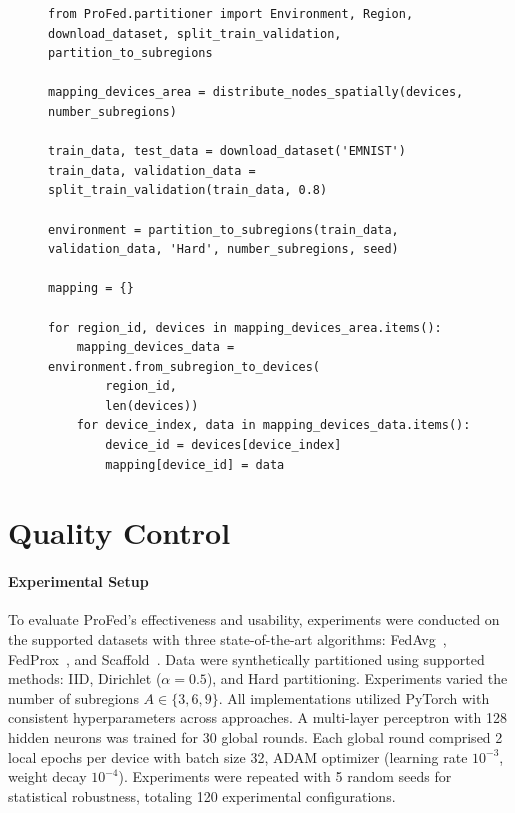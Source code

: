\begin{figure}
\begin{lstlisting}[style=proFedStyle, caption={An example of how ProFed is used to partition the EMNIST dataset among devices}, label={lst:api-example}]
from ProFed.partitioner import Environment, Region, download_dataset, split_train_validation, partition_to_subregions

mapping_devices_area = distribute_nodes_spatially(devices, number_subregions)

train_data, test_data = download_dataset('EMNIST')
train_data, validation_data = split_train_validation(train_data, 0.8)

environment = partition_to_subregions(train_data, validation_data, 'Hard', number_subregions, seed)

mapping = {}

for region_id, devices in mapping_devices_area.items():
    mapping_devices_data = environment.from_subregion_to_devices(
		region_id, 
		len(devices))
    for device_index, data in mapping_devices_data.items():
        device_id = devices[device_index]
        mapping[device_id] = data
\end{lstlisting}
\end{figure}

\section*{Quality Control}
\paragraph{Experimental Setup}
To evaluate ProFed's effectiveness and usability, 
 experiments were conducted on the supported datasets with three
 state-of-the-art algorithms: 
 FedAvg~\cite{DBLP:conf/aistats/McMahanMRHA17}, 
 FedProx~\cite{DBLP:conf/mlsys/LiSZSTS20}, and 
 Scaffold~\cite{DBLP:conf/icml/KarimireddyKMRS20}.
%
Data were synthetically partitioned using  
 supported methods: IID, Dirichlet ($\alpha=0.5$), and Hard partitioning.
%
Experiments varied the number of subregions $A \in \{3, 6, 9\}$.
%
All implementations utilized PyTorch with consistent hyperparameters across approaches. 
%
A multi-layer perceptron with 128 hidden neurons was
 trained for 30 global rounds. 
% 
Each global round comprised 2 local epochs per device 
 with batch size 32, ADAM optimizer (learning rate $10^{-3}$, 
 weight decay $10^{-4}$).
% 
Experiments were repeated with 5 random seeds for statistical robustness,
 totaling 120 experimental configurations.

